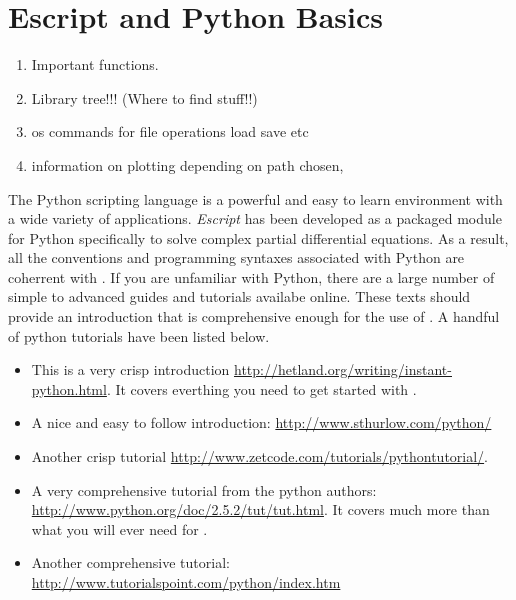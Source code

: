 
%
%
%

\section{Escript and Python Basics} \label{sec:escpybas}

\begin{enumerate}
 \item Important functions.
 \item Library tree!!! (Where to find stuff!!)
 \item os commands for file operations load save etc
 \item information on plotting depending on path chosen,
\end{enumerate}

The Python scripting language is a powerful and easy to learn environment with a wide variety of applications. \textit{Escript} has been developed as a packaged module for Python specifically to solve complex partial differential equations. As a result, all the conventions and programming syntaxes associated with Python are coherrent with \ESCRIPT. If you are unfamiliar with Python, there are a large number of simple to advanced guides and tutorials availabe online. These texts should provide an introduction that is comprehensive enough for the use of \ESCRIPT. A handful of python tutorials have been listed below.
\begin{itemize}
\item This is a very crisp introduction \url{http://hetland.org/writing/instant-python.html}. It covers everthing you need to get started with \ESCRIPT.
\item A nice and easy to follow introduction: \url{http://www.sthurlow.com/python/}
\item Another crisp tutorial \url{http://www.zetcode.com/tutorials/pythontutorial/}. 
 \item A very comprehensive tutorial from the python authors: \url{http://www.python.org/doc/2.5.2/tut/tut.html}. It covers much more than what you will ever need for \ESCRIPT.
\item Another comprehensive tutorial: \url{http://www.tutorialspoint.com/python/index.htm}
\end{itemize} 

